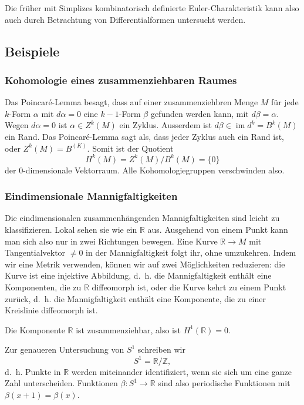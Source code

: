Die früher mit Simplizes kombinatorisch definierte Euler-Charakteristik
kann also auch durch Betrachtung von Differentialformen untersucht
werden.

%
%
\subsection{Beispiele}


%
%
\subsubsection{Kohomologie eines zusammenziehbaren Raumes}
Das Poincaré-Lemma besagt, dass auf einer zusammenziehbren Menge
$M$ für jede $k$-Form $\alpha$ mit $d\alpha=0$ eine $k-1$-Form
$\beta$ gefunden werden kann, mit $d\beta = \alpha$.
Wegen $d\alpha=0$ ist $\alpha\in Z^k(M)$ ein Zyklus.
Ausserdem ist $d\beta\in \operatorname{im}d^k = B^k(M)$ ein Rand.
Das Poincaré-Lemma sagt als, dass jeder Zyklus auch ein Rand ist,
oder $Z^k(M) = B^(K)$.
Somit ist der Quotient
\[
H^k(M)
=
Z^k(M) / B^k(M)
=
\{0\}
\]
der 0-dimensionale Vektorraum.
Alle Kohomologiegruppen verschwinden also.

%
%
\subsubsection{Eindimensionale Mannigfaltigkeiten}
Die eindimensionalen zusammenhängenden Mannigfaltigkeiten sind leicht
zu klassifizieren.
Lokal sehen sie wie ein $\mathbb{R}$ aus.
Ausgehend von einem Punkt kann man sich also nur in zwei Richtungen
bewegen.
Eine Kurve $\mathbb{R}\to M$ mit Tangentialvektor $\ne 0$ in der
Mannigfaltigkeit folgt ihr, ohne umzukehren.
Indem wir eine Metrik verwenden, können wir auf zwei Möglichkeiten
reduzieren: die Kurve ist eine injektive Abbildung, d.~h. die Mannigfaltigkeit
enthält eine Komponenten, die zu $\mathbb{R}$ diffeomorph ist,
oder die Kurve kehrt zu einem Punkt zurück, d.~h. die Mannigfaltigkeit
enthält eine Komponente, die zu einer Kreislinie diffeomorph ist.

Die Komponente $\mathbb{R}$ ist zusammenziehbar, also ist $H^1(\mathbb{R})=0$.

Zur genaueren Untersuchung von $S^1$ schreiben wir 
\[
S^1
=
\mathbb{R}/\mathbb{Z},
\]
d.~h. Punkte in $\mathbb{R}$ werden miteinander identifiziert, wenn
sie sich um eine ganze Zahl unterscheiden.
Funktionen $\beta\colon S^1\to\mathbb{R}$ sind also periodische Funktionen 
mit $\beta(x+1)=\beta(x)$.

